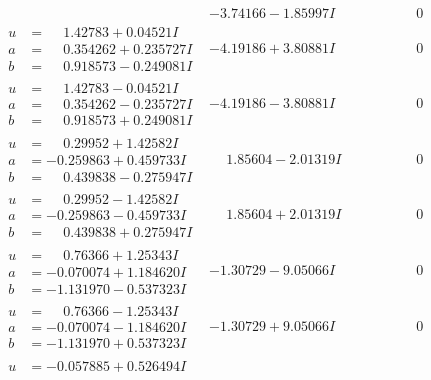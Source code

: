 \documentclass[1p]{elsarticle_modified}
\theoremstyle{definition}
\begin{document}
$$\begin{array}{c|c|c}
 & -3.74166 - 1.85997 I & \phantom{-0.000000 } 0 \\ \hline\begin{aligned}
u &= \phantom{-}1.42783 + 0.04521 I \\
a &= \phantom{-}0.354262 + 0.235727 I \\
b &= \phantom{-}0.918573 - 0.249081 I\end{aligned}
 & -4.19186 + 3.80881 I & \phantom{-0.000000 } 0 \\ \hline\begin{aligned}
u &= \phantom{-}1.42783 - 0.04521 I \\
a &= \phantom{-}0.354262 - 0.235727 I \\
b &= \phantom{-}0.918573 + 0.249081 I\end{aligned}
 & -4.19186 - 3.80881 I & \phantom{-0.000000 } 0 \\ \hline\begin{aligned}
u &= \phantom{-}0.29952 + 1.42582 I \\
a &= -0.259863 + 0.459733 I \\
b &= \phantom{-}0.439838 - 0.275947 I\end{aligned}
 & \phantom{-}1.85604 - 2.01319 I & \phantom{-0.000000 } 0 \\ \hline\begin{aligned}
u &= \phantom{-}0.29952 - 1.42582 I \\
a &= -0.259863 - 0.459733 I \\
b &= \phantom{-}0.439838 + 0.275947 I\end{aligned}
 & \phantom{-}1.85604 + 2.01319 I & \phantom{-0.000000 } 0 \\ \hline\begin{aligned}
u &= \phantom{-}0.76366 + 1.25343 I \\
a &= -0.070074 + 1.184620 I \\
b &= -1.131970 - 0.537323 I\end{aligned}
 & -1.30729 - 9.05066 I & \phantom{-0.000000 } 0 \\ \hline\begin{aligned}
u &= \phantom{-}0.76366 - 1.25343 I \\
a &= -0.070074 - 1.184620 I \\
b &= -1.131970 + 0.537323 I\end{aligned}
 & -1.30729 + 9.05066 I & \phantom{-0.000000 } 0 \\ \hline\begin{aligned}
u &= -0.057885 + 0.526494 I \\

\end{aligned}
\end{array}$$
\end{document}
